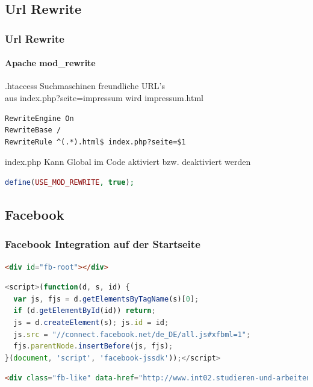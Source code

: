 \documentclass[xcolor=dvipsnames]{beamer}
\begin{document}
\subsection{Url Rewrite}
\begin{frame}[fragile]
  \frametitle{Url Rewrite}
  \framesubtitle{Apache mod\_rewrite} %

 \begin{block}{.htaccess}
	Suchmaschinen freundliche URL's \\
	aus index.php?seite=impressum wird impressum.html
  \end{block}

\begin{lstlisting}[language=HTML]
RewriteEngine On
RewriteBase /
RewriteRule ^(.*).html$ index.php?seite=$1
\end{lstlisting}

  \begin{block}{index.php}
	Kann Global im Code aktiviert bzw. deaktiviert werden
  \end{block}

\begin{lstlisting}[language=PHP, firstnumber=4]
define(USE_MOD_REWRITE, true);

\end{lstlisting}
\end{frame}

\subsection{Facebook}
\begin{frame}[fragile]
  \frametitle{Facebook Integration auf der Startseite}

\begin{lstlisting}[language=HTML]
<div id="fb-root"></div>
\end{lstlisting}

\begin{lstlisting}[language=JavaScript, firstnumber=3]
<script>(function(d, s, id) {
  var js, fjs = d.getElementsByTagName(s)[0];
  if (d.getElementById(id)) return;
  js = d.createElement(s); js.id = id;
  js.src = "//connect.facebook.net/de_DE/all.js#xfbml=1";
  fjs.parentNode.insertBefore(js, fjs);
}(document, 'script', 'facebook-jssdk'));</script>
\end{lstlisting}

\begin{lstlisting}[language=HTML, firstnumber=26]
<div class="fb-like" data-href="http://www.int02.studieren-und-arbeiten.de/" data-send="false" data-width="450" data-show-faces="true"></div>
\end{lstlisting}



\end{frame}
\end{document}
